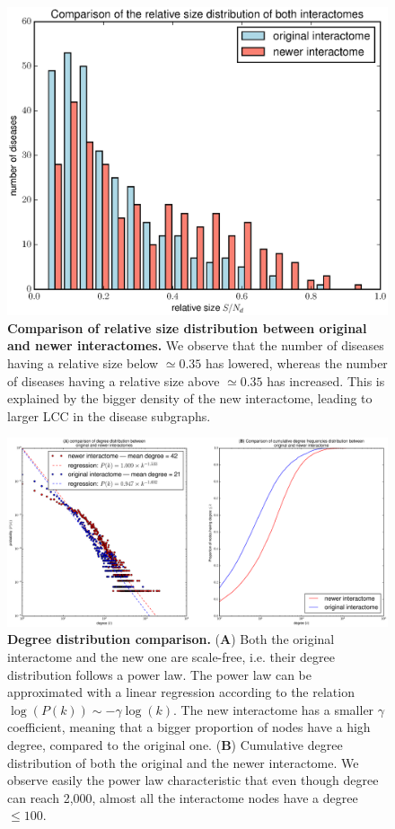 \documentclass[letterpaper]{article}
\begin{document}
	\begin{figure}[!h]
		\centering
		\includegraphics[width=.5\textwidth]{images/rel_sizes_comparison.eps}
		\vspace{-.5cm}
		\caption{{\bf Comparison of relative size distribution between original and newer interactomes.}
		We observe that the number of diseases having a relative size below $\simeq 0.35$ has lowered, whereas the number
		of diseases having a relative size above $\simeq 0.35$ has increased. This is explained by the bigger density of
		the new interactome, leading to larger LCC in the disease subgraphs.
		\label{fig:rel sizes comparison}}
	\end{figure}

	\begin{figure}[!t]
		\hspace{-1.8cm}
		\vspace{-.5cm}
		\includegraphics[scale=.45]{images/degree_distributions_comparison.eps}
		\caption{{\bf Degree distribution comparison.} ({\bf A})  Both the original interactome and the new one
		are scale-free, i.e. their degree distribution follows a power law. The power law can be approximated
		with a linear regression according to the relation $\log(P(k)) \sim -\gamma\log(k)$. The new interactome
		has a smaller $\gamma$ coefficient, meaning that a bigger proportion of nodes have a high degree,
		compared to the original one.
		({\bf B}) Cumulative degree distribution of both the original and the newer interactome. We observe
		easily the power law characteristic that even though degree can reach 2,000, almost all the interactome
		nodes have a degree $\leq 100$.
		\label{fig:degree distribution comparison}}
	\end{figure}
\end{document}
